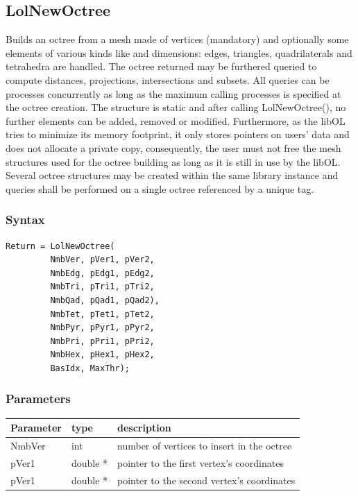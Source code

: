 \documentclass[a4paper,12pt]{article}
\begin{document}
\clearpage
\subsection{LolNewOctree}
Builds an octree from a mesh made of vertices (mandatory) and optionally some elements of various kinds like and dimensions: edges, triangles, quadrilaterals and tetrahedra are handled.
The octree returned may be furthered queried to compute distances, projections, intersections and subsets.
All queries can be processes concurrently as long as the maximum calling processes is specified at the octree creation.
The structure is static and after calling LolNewOctree(), no further elements can be added, removed or modified. Furthermore, as the libOL tries to minimize its memory footprint, it only stores pointers on users' data and does not allocate a private copy, consequently, the user must not free the mesh structures used for the octree building as long as it is still in use by the libOL.
Several octree structures may be created within the same library instance and queries shall be performed on a single octree referenced by a unique tag.

\subsubsection*{Syntax}
\begin{tt}
\begin{verbatim}
Return = LolNewOctree(
         NmbVer, pVer1, pVer2,
         NmbEdg, pEdg1, pEdg2,
         NmbTri, pTri1, pTri2,
         NmbQad, pQad1, pQad2),
         NmbTet, pTet1, pTet2,
         NmbPyr, pPyr1, pPyr2,
         NmbPri, pPri1, pPri2,
         NmbHex, pHex1, pHex2,
         BasIdx, MaxThr);
\end{verbatim}
\end{tt}
\normalfont

\subsubsection*{Parameters}

\begin{tabular}{|m{2cm}|m{2cm}|m{10cm}|}
\hline
Parameter  & type     & description \\
\hline
NmbVer     & int      & number of vertices to insert in the octree \\
\hline
pVer1      & double * & pointer to the first vertex's coordinates \\
\hline
pVer1      & double * & pointer to the second vertex's coordinates \\
\hline
\end{tabular}
\end{document}
